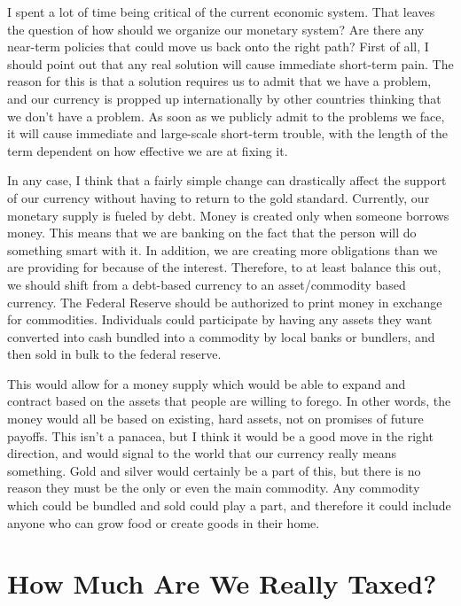 \begin{policynote}
I spent a lot of time being critical of the current economic system.
That leaves the question of how should we organize our monetary system?
Are there any near-term policies that could move us back onto the right path?
First of all, I should point out that any real solution will cause immediate 
short-term pain.  The reason for this is that a solution requires us to
admit that we have a problem, and our currency is propped up internationally
by other countries thinking that we don't have a problem.  As soon as we
publicly admit to the problems we face, it will cause immediate and large-scale
short-term trouble, with the length of the term dependent on how effective 
we are at fixing it.  

In any case, I think that a fairly simple change
can drastically affect the support of our currency without having to return
to the gold standard.  Currently, our monetary supply is fueled by debt.
Money is created only when someone borrows money.  This means that we
are banking on the fact that the person will do something smart with it.
In addition, we are creating more obligations than we are providing for
because of the interest.  Therefore, to at least balance this out, we
should shift from a debt-based currency to an asset/commodity based currency.
The Federal Reserve should be authorized to print money in exchange for 
commodities.  Individuals could participate by having any assets they
want converted into cash bundled into a commodity by local banks or
bundlers, and then sold in bulk to the federal reserve.  

This would allow
for a money supply which would be able to expand and contract based on 
the assets that people are willing to forego.  In other words, the money
would all be based on existing, hard assets, not on promises of future
payoffs.  This isn't a panacea, but I think it would be a good move
in the right direction, and would signal to the world that our currency
really means something.  Gold and silver would certainly be a part of this,
but there is no reason they must be the only or even the main commodity.
Any commodity which could be bundled and sold could play a part, and therefore
it could include anyone who can grow food or create goods in their home.
\end{policynote}

\section{How Much Are We Really Taxed?}

